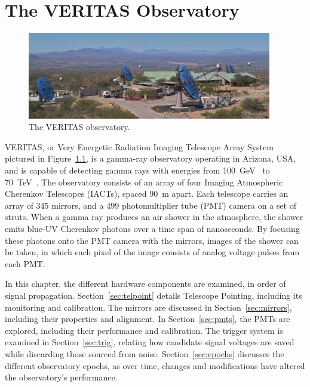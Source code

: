 \cleartooddpage[\thispagestyle{empty}]
\chapter{The VERITAS Observatory}\label{chapter:veritas}

\begin{figure}[ht]
  \centering
  \includegraphics[width=0.95\textwidth]{images/veritas_array_v6}
  \caption[VERITAS Array]{
    The VERITAS observatory.}
  \label{fig:veritasarray}
\end{figure}

VERITAS, or Very Energetic Radiation Imaging Telescope Array System pictured in Figure~\ref{fig:veritasarray}, is a gamma-ray observatory operating in Arizona, USA, and is capable of detecting gamma rays with energies from \SI{100}{\GeV{}} to \SI{70}{\TeV{}}.
The observatory consists of an array of four Imaging Atmospheric Cherenkov Telescopes (IACTs), spaced \nicetilde{}\SI{90}{m} apart.
Each telescope carries an array of 345 mirrors, and a 499 photomultiplier tube (PMT) camera on a set of struts.
When a gamma ray produces an air shower in the atmosphere, the shower emits blue-UV Cherenkov photons over a time span of nanoseconds.
By focusing these photons onto the PMT camera with the mirrors, images of the shower can be taken, in which each pixel of the image consists of analog voltage pulses from each PMT.


In this chapter, the different hardware components are examined, in order of signal propagation.
Section~\ref{sec:telpoint} details Telescope Pointing, including its monitoring and calibration.
The mirrors are discussed in Section~\ref{sec:mirrors}, including their properties and alignment.
In Section~\ref{sec:pmts}, the PMTs are explored, including their performance and calibration.
The trigger system is examined in Section~\ref{sec:trig}, relating how candidate signal voltages are saved while discarding those sourced from noise.
Section~\ref{sec:epochs} discusses the different observatory epochs, as over time, changes and modifications have altered the observatory's performance.


